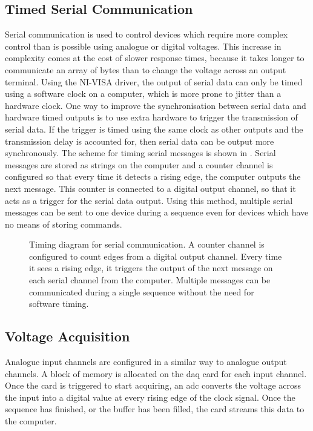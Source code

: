 \subsection{Timed Serial Communication}\label{subsec:compinterface_serial}
Serial communication is used to control devices which require more complex
control than is possible using analogue or digital voltages. This increase in
complexity comes at the cost of slower response times, because it takes
longer to communicate an array of bytes than to change the voltage
across an output terminal. Using the NI-VISA driver, the output of serial
data can only be timed using a software clock on a computer, which is more
prone to jitter than a hardware clock. One way to improve the synchronisation
between serial data and hardware timed outputs is to use extra hardware to
trigger the transmission of serial data. If the trigger is timed using the
same clock as other outputs and the transmission delay is accounted for, then
serial data can be output more synchronously. The scheme for timing serial
messages is shown in . Serial messages are
stored as strings on the computer and a counter channel is configured so that
every time it detects a rising edge, the computer outputs the next message.
This counter is connected to a digital output channel, so that it acts as a
trigger for the serial data output. Using this method, multiple serial
messages can be sent to one device during a sequence even for devices which
have no means of storing commands.
\begin{figure}[!htbp]
    \centering
    
    \caption[Timing diagram for serial communication]{Timing diagram for
    serial communication. A counter channel is configured to count edges from
    a digital output channel. Every time it sees a rising edge, it triggers
    the output of the next message on each serial channel from the computer.
    Multiple messages can be communicated during a single sequence without
    the need for software timing.}\label{fig:serial_timing}
\end{figure} 
\subsection{Voltage Acquisition}\label{subsec:compinterface_mmacquisition}
Analogue input channels are configured in a similar way to analogue output
channels. A block of memory is allocated on the \ac{daq} card for each input
channel. Once the card is triggered to start acquiring, an \ac{adc} converts
the voltage across the input into a digital value at every rising edge of the
clock signal. Once the sequence has finished, or the buffer has been filled,
the card streams this data to the computer.

